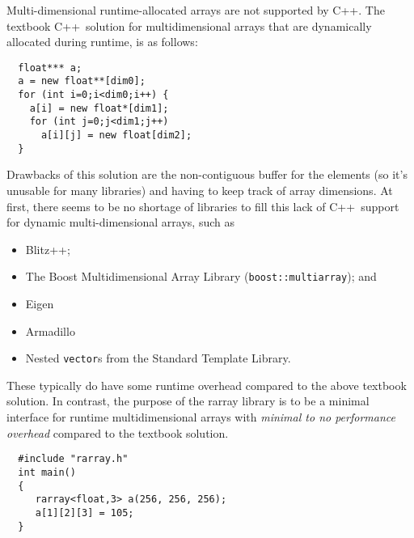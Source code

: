 \documentclass[12pt,twoside]{article}
\newcommand{\cxx}{C{++}}
\begin{document}
Multi-dimensional runtime-allocated arrays are not supported by \cxx.
The textbook \cxx\ solution for multidimensional arrays that are
dynamically allocated during runtime, is as follows:
\vspace{-5pt}\begin{framed}\vspace{-14pt}%
\begin{verbatim}
  float*** a;
  a = new float**[dim0];
  for (int i=0;i<dim0;i++) {
    a[i] = new float*[dim1];
    for (int j=0;j<dim1;j++) 
      a[i][j] = new float[dim2];
  }
\end{verbatim}%
\vspace{-12pt}\end{framed}\vspace{-5pt}%
Drawbacks of this solution are the non-contiguous buffer for the
elements (so it's unusable for many libraries) and having to keep
track of array dimensions.
At first, there seems to be no shortage of libraries to fill this
lack of \cxx\ support for dynamic multi-dimensional arrays, such as
\begin{itemize}\itemsep 0pt \parskip 0pt
\item 
Blitz++;
\item 
The Boost Multidimensional Array Library (\texttt{boost::multiarray}); 
and
\item Eigen
\item Armadillo
\item 
Nested \texttt{vector}s from the Standard Template Library.
\end{itemize}
These typically do have some runtime overhead compared to the above
textbook solution. In contrast, the purpose of the rarray
library is to be a minimal interface for runtime multidimensional arrays with
\emph{minimal to no performance overhead} compared to the textbook solution.

\begin{framed}\vspace{-14pt}%
\begin{verbatim}
  #include "rarray.h"
  int main() 
  {
     rarray<float,3> a(256, 256, 256);
     a[1][2][3] = 105;
  }
\end{verbatim}%
\vspace{-14pt}%
\end{framed}
\end{document}
